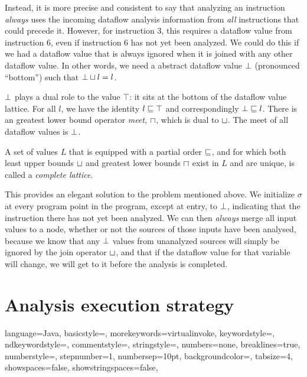 \documentclass[11pt]{article}
\begin{document}
Instead, it is more precise and consistent to say that analyzing an instruction \emph{always} uses the
incoming dataflow analysis information from \emph{all} instructions that could precede
it.  However, for instruction 3, this requires a dataflow value from
instruction 6, even if instruction 6 has not yet been analyzed.  We
could do this if we had a dataflow value that is always ignored when it is
joined with any other dataflow value.  In other words, we need a abstract
dataflow value $\bot$ (pronounced ``bottom'') such that $\bot \sqcup l =
l$.

$\bot$ plays a dual role to the value $\top$: it sits at the bottom of the
dataflow value lattice.  For all $l$, we have the identity $l \sqsubseteq \top$ and
correspondingly $\bot \sqsubseteq l$.  There is an greatest lower bound operator
\textit{meet}, $\sqcap$, which is dual to $\sqcup$.  The meet of all dataflow
values is $\bot$.

A set of values $L$ that is equipped with a partial order $\sqsubseteq$, and for which
both least upper bounds $\sqcup$ and greatest lower bounds $\sqcap$ exist in $L$
and are unique, is called a \emph{complete lattice}.

This provides an elegant solution to
the problem mentioned above.  We initialize $\sigma$ at every program point in
the program, except at entry, to $\bot$, indicating that the instruction
there has not yet been analyzed.  We can then \emph{always} merge all input
values to a node, whether or not the sources of those inputs have been analysed,
because we know that any $\bot$ values from unanalyzed sources will simply be
ignored by the join operator $\sqcup$, and that if the dataflow value for that
variable will change, we will get to it before the analysis is completed.

\section{Analysis execution strategy}



 {
language=Java,
basicstyle=\ttfamily,
  morekeywords={virtualinvoke},
  keywordstyle=\color{blue},
  ndkeywordstyle=\color{red},
  commentstyle=\color{dkred},
  stringstyle=\color{dkgreen},
  numbers=none,
  breaklines=true,
  numberstyle=\ttfamily\footnotesize\color{gray},
  stepnumber=1,
  numbersep=10pt,
  backgroundcolor=\color{white},
  tabsize=4,
  showspaces=false,
  showstringspaces=false,
}
\lstset{style=javastyle}
\end{document}
